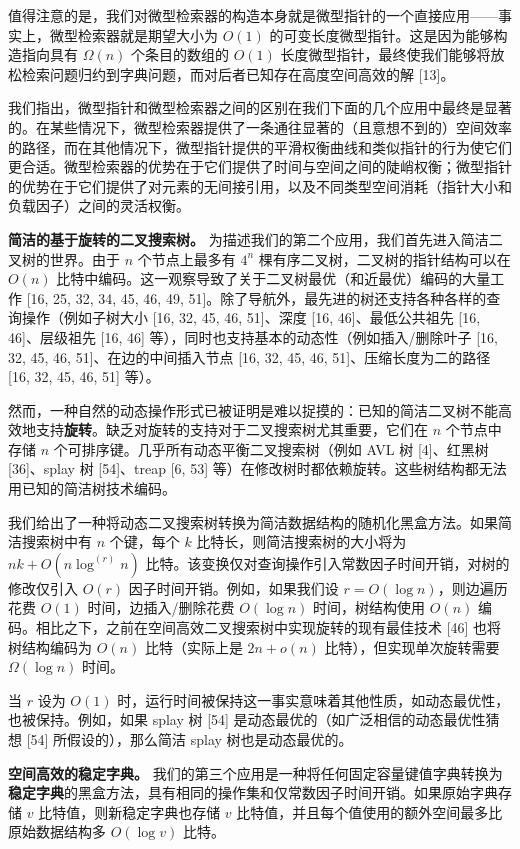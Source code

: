 \documentclass[12pt,a4paper]{ctexart}
\theoremstyle{remark}
\begin{document}
值得注意的是，我们对微型检索器的构造本身就是微型指针的一个直接应用——事实上，微型检索器就是期望大小为 $O(1)$ 的可变长度微型指针。这是因为能够构造指向具有 $\Omega(n)$ 个条目的数组的 $O(1)$ 长度微型指针，最终使我们能够将放松检索问题归约到字典问题，而对后者已知存在高度空间高效的解 [13]。

我们指出，微型指针和微型检索器之间的区别在我们下面的几个应用中最终是显著的。在某些情况下，微型检索器提供了一条通往显著的（且意想不到的）空间效率的路径，而在其他情况下，微型指针提供的平滑权衡曲线和类似指针的行为使它们更合适。微型检索器的优势在于它们提供了时间与空间之间的陡峭权衡；微型指针的优势在于它们提供了对元素的无间接引用，以及不同类型空间消耗（指针大小和负载因子）之间的灵活权衡。

\textbf{简洁的基于旋转的二叉搜索树。} 为描述我们的第二个应用，我们首先进入简洁二叉树的世界。由于 $n$ 个节点上最多有 $4^n$ 棵有序二叉树，二叉树的指针结构可以在 $O(n)$ 比特中编码。这一观察导致了关于二叉树最优（和近最优）编码的大量工作 [16, 25, 32, 34, 45, 46, 49, 51]。除了导航外，最先进的树还支持各种各样的查询操作（例如子树大小 [16, 32, 45, 46, 51]、深度 [16, 46]、最低公共祖先 [16, 46]、层级祖先 [16, 46] 等），同时也支持基本的动态性（例如插入/删除叶子 [16, 32, 45, 46, 51]、在边的中间插入节点 [16, 32, 45, 46, 51]、压缩长度为二的路径 [16, 32, 45, 46, 51] 等）。

然而，一种自然的动态操作形式已被证明是难以捉摸的：已知的简洁二叉树不能高效地支持\textbf{旋转}。缺乏对旋转的支持对于二叉搜索树尤其重要，它们在 $n$ 个节点中存储 $n$ 个可排序键。几乎所有动态平衡二叉搜索树（例如 AVL 树 [4]、红黑树 [36]、splay 树 [54]、treap [6, 53] 等）在修改树时都依赖旋转。这些树结构都无法用已知的简洁树技术编码。

我们给出了一种将动态二叉搜索树转换为简洁数据结构的随机化黑盒方法。如果简洁搜索树中有 $n$ 个键，每个 $k$ 比特长，则简洁搜索树的大小将为 $nk+O(n\log^{(r)}n)$ 比特。该变换仅对查询操作引入常数因子时间开销，对树的修改仅引入 $O(r)$ 因子时间开销。例如，如果我们设 $r=O(\log n)$，则边遍历花费 $O(1)$ 时间，边插入/删除花费 $O(\log n)$ 时间，树结构使用 $O(n)$ 编码。相比之下，之前在空间高效二叉搜索树中实现旋转的现有最佳技术 [46] 也将树结构编码为 $O(n)$ 比特（实际上是 $2n+o(n)$ 比特），但实现单次旋转需要 $\Omega(\log n)$ 时间。

当 $r$ 设为 $O(1)$ 时，运行时间被保持这一事实意味着其他性质，如动态最优性，也被保持。例如，如果 splay 树 [54] 是动态最优的（如广泛相信的动态最优性猜想 [54] 所假设的），那么简洁 splay 树也是动态最优的。

\textbf{空间高效的稳定字典。} 我们的第三个应用是一种将任何固定容量键值字典转换为\textbf{稳定字典}的黑盒方法，具有相同的操作集和仅常数因子时间开销。如果原始字典存储 $v$ 比特值，则新稳定字典也存储 $v$ 比特值，并且每个值使用的额外空间最多比原始数据结构多 $O(\log v)$ 比特。
\end{document}
